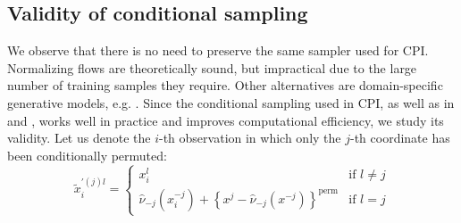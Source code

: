 \documentclass{article}
\theoremstyle{plain}
\theoremstyle{definition}
\theoremstyle{remark}
\begin{document}
\subsection{Validity of conditional sampling}\label{subsec:cond_sampl}
We observe that there is no need to preserve the same sampler used for CPI. Normalizing flows \citep{papamakarios2021normalizingflowsprobabilisticmodeling} are theoretically sound, but impractical due to the large number of training samples they require. Other alternatives are domain-specific generative models, e.g. \citet{sesia2020}. Since the conditional sampling used in CPI, as well as in \citet{Hooker2021} and \citet{blain2025knockoffsfaildiagnosingfixing}, works well in practice and improves computational efficiency, we study its validity.
%
Let us denote the $i$-th observation in which only the $j$-th coordinate has been conditionally permuted: %
\begin{equation}
 \widetilde{x}^{'(j)l}_{i}=
\begin{cases}
 x^l_i & \text{if } l\neq j \\
  \widehat{\nu}_{-j}(x_i^{-j})+\left\{x^j-\widehat{\nu}_{-j}(x^{-j})\right\}^\mathrm{perm} & \text{if } l=j
\end{cases}\label{eq:cpi-sampling}
\end{equation}
\end{document}
